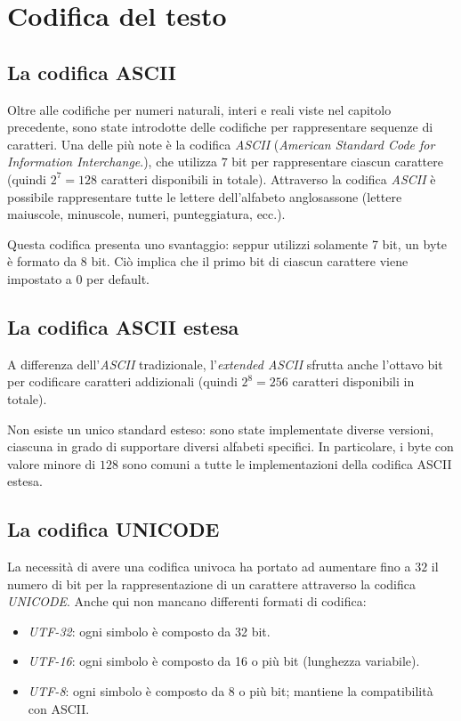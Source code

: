\documentclass[class=book, crop=false, oneside]{standalone}
\begin{document}
\chapter{Codifica del testo}
\section{La codifica ASCII}
Oltre alle codifiche per numeri naturali, interi e reali viste nel capitolo precedente, sono state introdotte delle codifiche per rappresentare sequenze di caratteri. Una delle più note è la codifica \emph{ASCII} (\emph{American Standard Code for Information Interchange}.), che utilizza \(7\) bit per rappresentare ciascun carattere (quindi \(2^7=128\) caratteri disponibili in totale).
Attraverso la codifica \emph{ASCII} è possibile rappresentare tutte le lettere dell'alfabeto anglosassone (lettere maiuscole, minuscole, numeri, punteggiatura, ecc.).

Questa codifica presenta uno svantaggio: seppur utilizzi solamente 7 bit, un byte è formato da 8 bit. Ciò implica che il primo bit di ciascun carattere viene impostato a 0 per default.

\section{La codifica ASCII estesa}
A differenza dell'\emph{ASCII} tradizionale, l'\emph{extended ASCII} sfrutta anche l'ottavo bit per codificare caratteri addizionali (quindi \(2^8=256\) caratteri disponibili in totale).

Non esiste un unico standard esteso: sono state implementate diverse versioni, ciascuna in grado di supportare diversi alfabeti specifici. In particolare, i byte con valore minore di \(128\) sono comuni a tutte le implementazioni della codifica ASCII estesa.

\section{La codifica UNICODE}
La necessità di avere una codifica univoca ha portato ad aumentare fino a \(32\) il numero di bit per la rappresentazione di un carattere attraverso la codifica \emph{UNICODE}. Anche qui non mancano differenti formati di codifica:
\begin{itemize}[noitemsep]
	\item \emph{UTF-32}: ogni simbolo è composto da 32 bit.
	\item \emph{UTF-16}: ogni simbolo è composto da 16 o più bit (lunghezza variabile).
	\item \emph{UTF-8}: ogni simbolo è composto da 8 o più bit; mantiene la compatibilità con ASCII.
\end{itemize}
\end{document}
